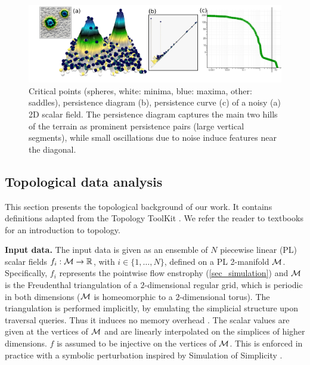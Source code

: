 \begin{figure}
 \centering
 \vspace{-1ex}
 \includegraphics[width=\figureShrink\linewidth]{chapter4_topology_data_analysis/pictures/topo_gaussian.jpg}
 \caption{Critical points (spheres, white: minima, blue: maxima, other:
saddles), persistence diagram (b), persistence curve (c) of
a noisy (a) 2D
scalar field. The persistence diagram captures the main two hills of the
terrain as prominent persistence pairs (large vertical segments), while small
oscillations due to noise induce features near the diagonal.}
 \label{fig_toyTopology}
\end{figure}






\subsection{Topological data analysis}
\label{sec_topology}



This section presents the topological background of our work. It contains
definitions adapted from the Topology ToolKit \cite{ttk17}.
We refer the
reader to textbooks \cite{edelsbrunner09} for an introduction to
topology.

\noindent
\textbf{Input data.}
The input data is given as an ensemble of $N$ piecewise linear (PL) scalar
fields
$f_i : \mathcal{M} \rightarrow \mathbb{R}$, with $i \in \{1, \dots,  N\}$, defined on a
PL 2-manifold $\mathcal{M}$.
Specifically, $f_i$ represents the pointwise flow enstrophy
(\autoref{sec_simulation}) and $\mathcal{M}$ is the Freudenthal triangulation
\cite{freudenthal42, kuhn60} of a $2$-dimensional regular grid, which is
periodic in both dimensions ($\mathcal{M}$ is homeomorphic to a $2$-dimensional
torus). The triangulation is performed implicitly, by emulating the
simplicial structure upon traversal queries. Thus it induces no
memory overhead \cite{ttk17}.
The scalar values are given at the vertices of $\mathcal{M}$ and are linearly
interpolated
on the simplices of higher dimensions.
$f$ is assumed to be injective on the vertices  of $\mathcal{M}$.
This is
enforced in practice with a symbolic
perturbation inspired by Simulation of Simplicity \cite{edelsbrunner90}.


